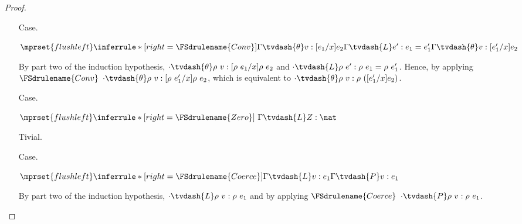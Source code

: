 \begin{proof}
\begin{itemize}
  \item[Case.]\ \\
    \begin{center}
      \begin{math}
        $$\mprset{flushleft}
        \inferrule* [right=\FSdrulename{Conv}] {
          \Gamma \tvdash{\theta} v:[e_1/x]e_2
          \\\\
          \Gamma \tvdash{L} e':e_1 = e'_1
        }{\Gamma \tvdash{\theta} v:[e'_1/x]e_2}
      \end{math}
    \end{center}
    By part two of the induction hypothesis, 
    $\cdot \tvdash{\theta} \rho\ v:[\rho\ e_1/x]\rho\ e_2$ and 
    $\cdot \tvdash{L} \rho\ e':\rho\ e_1 = \rho\ e'_1$. Hence, by applying
    $\FSdrulename{Conv}$ $\cdot \tvdash{\theta} \rho\ v:[\rho\ e'_1/x]\rho\ e_2$, which
    is equivalent to $\cdot \tvdash{\theta} \rho\ v:\rho\ ([e'_1/x]e_2)$.

  \item[Case.]\ \\
    \begin{center}
      \begin{math}
        $$\mprset{flushleft}
        \inferrule* [right=\FSdrulename{Zero}] {
          \ 
        }{\Gamma \tvdash{L} Z:\nat}
      \end{math}
    \end{center}
    Tivial.

  \item[Case.]\ \\
    \begin{center}
      \begin{math}
        $$\mprset{flushleft}
        \inferrule* [right=\FSdrulename{Coerce}] {
          \Gamma \tvdash{L} v:e_1
        }{\Gamma \tvdash{P} v:e_1}
      \end{math}
    \end{center}
    By part two of the induction hypothesis, $\cdot \tvdash{L} \rho\ v:\rho\ e_1$ and by applying
    $\FSdrulename{Coerce}$ $\cdot \tvdash{P} \rho\ v:\rho\ e_1$.


\end{itemize}
\end{proof}

